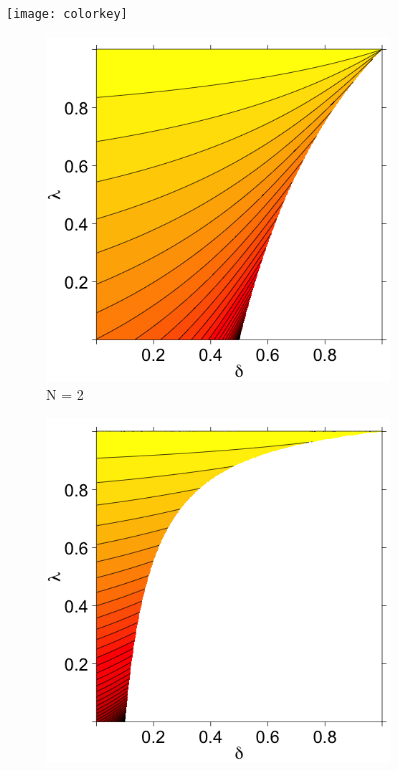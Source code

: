 \documentclass[11pt]{article}
\theoremstyle{definition}
\theoremstyle{definition}
\begin{document}
\begin{figure}[t]
\centering
\hspace*{1.2em} 	\texttt{[image: colorkey]} %
        \centering
        \begin{subfigure}[b]{0.499\textwidth}
                \includegraphics[width=\textwidth]{ExtremeN2}
\caption{N = 2}	
\label{ExtremeN2}
        \end{subfigure}%
        \begin{subfigure}[b]{0.499\textwidth}
                \includegraphics[width=\textwidth]{ExtremeN10}

\end{subfigure}
\end{figure}
\end{document}
